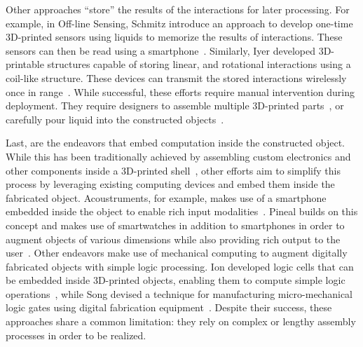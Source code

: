       Other approaches ``store'' the results of the interactions for
      later processing. For example, in Off-line Sensing, Schmitz \etal
      introduce an approach to develop one-time 3D-printed sensors using
      liquids to memorize the results of interactions. These sensors can
      then be read using a smartphone~\cite{Schmitz:2018}. Similarly,
      Iyer \etal developed 3D-printable structures capable of storing
      linear, and rotational interactions using a coil-like structure.
      These devices can transmit the stored interactions wirelessly once
      in range~\cite{Iyer:2018}. While successful, these efforts require
      manual intervention during deployment. They require designers to
      assemble multiple 3D-printed parts~\cite{Iyer:2018}, or carefully
      pour liquid into the constructed objects~\cite{Schmitz:2018}.

      Last, are the endeavors that embed computation inside the constructed
      object. While this has been traditionally achieved by assembling custom
      electronics and other components inside a 3D-printed
      shell~\cite{Murray-Smith:2008}, other efforts aim to simplify this process
      by leveraging existing computing devices and embed them inside the
      fabricated object. Acoustruments, for example, makes use of a smartphone
      embedded inside the object to enable rich input
      modalities~\cite{Laput:2015}. Pineal builds on this concept and makes use
      of smartwatches in addition to smartphones in order to augment objects of
      various dimensions while also providing rich output to the
      user~\cite{Ledo:2017}. Other endeavors make use of mechanical computing to
      augment digitally fabricated objects with simple logic processing. Ion
      \etal developed logic cells that can be embedded inside 3D-printed
      objects, enabling them to compute simple logic operations~\cite{Ion:2017},
      while Song \etal devised a technique for manufacturing micro-mechanical
      logic gates using digital fabrication equipment~\cite{Song:2019}. Despite
      their success, these approaches share a common limitation: they rely on
      complex or lengthy assembly processes in order to be realized.

